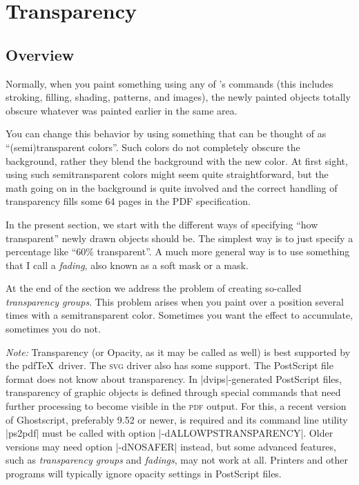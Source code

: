 %
%
%


\section[tikz-transparency]{Transparency}
\label{section-tikz-transparency}

\subsection{Overview}

Normally, when you paint something using any of \tikzname's commands (this
includes stroking, filling, shading, patterns, and images), the newly painted
objects totally obscure whatever was painted earlier in the same area.

You can change this behavior by using something that can be thought of as
``(semi)transparent colors''. Such colors do not completely obscure the
background, rather they blend the background with the new color. At first
sight, using such semitransparent colors might seem quite straightforward, but
the math going on in the background is quite involved and the correct handling
of transparency fills some 64 pages in the PDF specification.

In the present section, we start with the different ways of specifying ``how
transparent'' newly drawn objects should be. The simplest way is to just
specify a percentage like ``60\% transparent''. A much more general way is to
use something that I call a \emph{fading}, also known as a soft mask or a mask.

At the end of the section we address the problem of creating so-called
\emph{transparency groups}. This problem arises when you paint over a position
several times with a semitransparent color. Sometimes you want the effect to
accumulate, sometimes you do not.

\emph{Note:} Transparency (or Opacity, as it may be called as well) is best
supported by the pdf\TeX\ driver. The \textsc{svg} driver also has some
support. The PostScript file format does not know about transparency. In
|dvips|-generated PostScript files, transparency of graphic objects is defined
through special commands that need further processing to become visible in the
\textsc{pdf} output. For this, a recent version of Ghostscript, preferably 9.52
or newer, is required and its command line utility |ps2pdf| must be called with
option |-dALLOWPSTRANSPARENCY|. Older versions may need option |-dNOSAFER|
instead, but some advanced features, such as \emph{transparency groups} and
\emph{fadings}, may not work at all. Printers and other programs will typically
ignore opacity settings in PostScript files.


